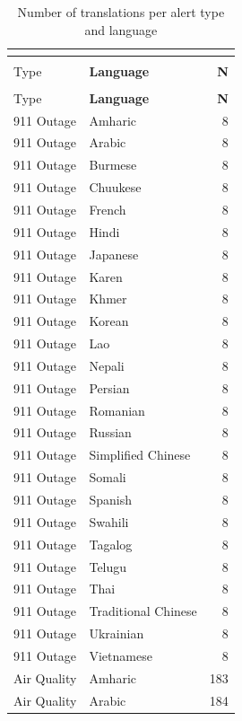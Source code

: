 \begin{longtable}{p{3cm} p{3cm} r}
\caption{Number of translations per alert type and language} \\
\label{tab:translations_full} \\
\hline
\textbf{Alert\\Type} & \textbf{Language} & \textbf{N} \\
\hline
\endfirsthead

\hline
\textbf{Alert\\Type} & \textbf{Language} & \textbf{N} \\
\hline
\endhead

\hline
\endfoot

\hline
\endlastfoot

911 Outage & Amharic & 8 \\
911 Outage & Arabic & 8 \\
911 Outage & Burmese & 8 \\
911 Outage & Chuukese & 8 \\
911 Outage & French & 8 \\
911 Outage & Hindi & 8 \\
911 Outage & Japanese & 8 \\
911 Outage & Karen & 8 \\
911 Outage & Khmer & 8 \\
911 Outage & Korean & 8 \\
911 Outage & Lao & 8 \\
911 Outage & Nepali & 8 \\
911 Outage & Persian & 8 \\
911 Outage & Romanian & 8 \\
911 Outage & Russian & 8 \\
911 Outage & Simplified Chinese & 8 \\
911 Outage & Somali & 8 \\
911 Outage & Spanish & 8 \\
911 Outage & Swahili & 8 \\
911 Outage & Tagalog & 8 \\
911 Outage & Telugu & 8 \\
911 Outage & Thai & 8 \\
911 Outage & Traditional Chinese & 8 \\
911 Outage & Ukrainian & 8 \\
911 Outage & Vietnamese & 8 \\
Air Quality & Amharic & 183 \\
Air Quality & Arabic & 184 \\

\end{longtable}
